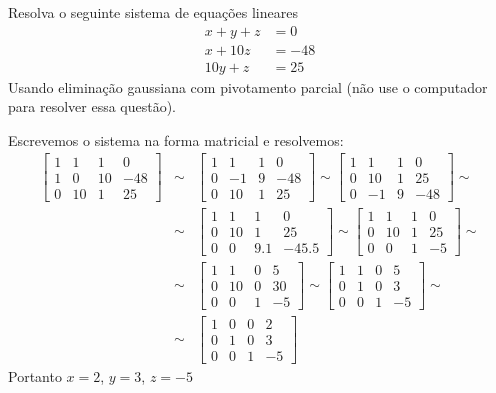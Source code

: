 \begin{exer} Resolva o seguinte sistema de equações lineares
\begin{equation}
  \begin{split}
    x+y+z&=0\\
    x+10z&=-48\\
    10y+z&=25
  \end{split}
\end{equation}
Usando eliminação gaussiana com pivotamento parcial (não use o computador para resolver essa questão).
\end{exer}
\begin{resp}
Escrevemos o sistema na forma matricial e resolvemos:
\begin{eqnarray}
\left[
\begin{array}{ccc|c}
1&1&1&0\\
1&0&10&-48\\
0&10&1&25
\end{array}\right] &\sim&
\left[
\begin{array}{ccc|c}
1&1&1&0\\
0&-1&9&-48\\
0&10&1&25
\end{array}\right] \sim
\left[
\begin{array}{ccc|c}
1&1&1&0\\
0&10&1&25\\
0&-1&9&-48
\end{array}\right]\sim\\
&\sim&\left[
\begin{array}{ccc|c}
1&1&1&0\\
0&10&1&25\\
0&0&9.1&-45.5
\end{array}\right]\sim
\left[
\begin{array}{ccc|c}
1&1&1&0\\
0&10&1&25\\
0&0&1&-5
\end{array}\right]\sim\\
&\sim&\left[
\begin{array}{ccc|c}
1&1&0&5\\
0&10&0&30\\
0&0&1&-5
\end{array}\right]
\sim\left[
\begin{array}{ccc|c}
1&1&0&5\\
0&1&0&3\\
0&0&1&-5
\end{array}\right]\sim\\
&\sim&\left[
\begin{array}{ccc|c}
1&0&0&2\\
0&1&0&3\\
0&0&1&-5
\end{array}\right]
\end{eqnarray}
Portanto $x=2$, $y=3$, $z=-5$

\end{resp}

